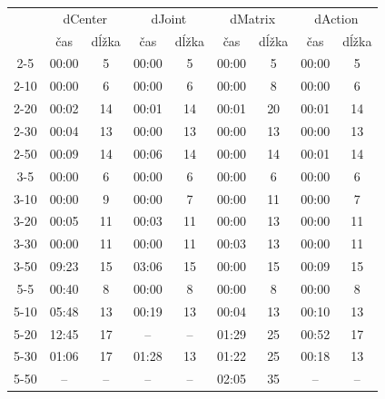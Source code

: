 \documentclass[
  printed, %
  oneside, %
  notable,   %
  nolof,     %
  nolot,     %
]{fithesis3}
\begin{document}
\begin{table}[hp!]
\centering
\begin{tabular}{c|cc|cc|cc|cc}
\multirow{2}{*}{} & \multicolumn{2}{c|}{dCenter} & \multicolumn{2}{c|}{dJoint} & \multicolumn{2}{c|}{dMatrix} & \multicolumn{2}{c}{dAction} \\
 & čas & dĺžka & čas & dĺžka & čas & dĺžka & čas & dĺžka \\ \hline
2-5  & 00:00 & 5  & 00:00 & 5  & \cellcolor{table-green}00:00 & \cellcolor{table-green}5  & 00:00 & 5  \\
2-10  & 00:00 & 6  & 00:00 & 6  & 00:00 & 8  & \cellcolor{table-green}00:00 & \cellcolor{table-green}6  \\
2-20  & 00:02 & 14  & 00:01 & 14  & 00:01 & 20  & \cellcolor{table-green}00:01 & \cellcolor{table-green}14  \\
2-30  & 00:04 & 13  & 00:00 & 13  & \cellcolor{table-green}00:00 & \cellcolor{table-green}13  & 00:00 & 13  \\
2-50  & 00:09 & 14  & 00:06 & 14  & \cellcolor{table-green}00:00 & \cellcolor{table-green}14  & 00:01 & 14  \\ \hline
3-5  & 00:00 & 6  & 00:00 & 6  & \cellcolor{table-green}00:00 & \cellcolor{table-green}6  & 00:00 & 6  \\
3-10  & 00:00 & 9  & 00:00 & 7  & 00:00 & 11  & \cellcolor{table-green}00:00 & \cellcolor{table-green}7  \\
3-20  & 00:05 & 11  & 00:03 & 11  & 00:00 & 13  & \cellcolor{table-green}00:00 & \cellcolor{table-green}11  \\
3-30  & 00:00 & 11  & 00:00 & 11  & 00:03 & 13  & \cellcolor{table-green}00:00 & \cellcolor{table-green}11  \\
3-50  & 09:23 & 15  & 03:06 & 15  & \cellcolor{table-green}00:00 & \cellcolor{table-green}15  & 00:09 & 15  \\ \hline
5-5  & 00:40 & 8  & 00:00 & 8  & \cellcolor{table-green}00:00 & \cellcolor{table-green}8  & 00:00 & 8  \\
5-10  & 05:48 & 13  & 00:19 & 13  & \cellcolor{table-green}00:04 & \cellcolor{table-green}13  & 00:10 & 13  \\
5-20  & 12:45 & 17  & -- & --  & 01:29 & 25  & \cellcolor{table-green}00:52 & \cellcolor{table-green}17  \\
5-30  & 01:06 & 17  & 01:28 & 13  & 01:22 & 25  & \cellcolor{table-green}00:18 & \cellcolor{table-green}13  \\
5-50  & -- & --  & -- & --  & \cellcolor{table-green}02:05 & \cellcolor{table-green}35  & -- & --  \\ \hline

\end{tabular}
\end{table}
\end{document}

